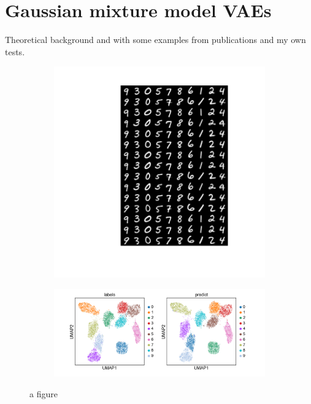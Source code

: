 \documentclass[11pt, a4paper]{report}
\theoremstyle{plain}
\theoremstyle{definition}
\theoremstyle{remark}
\begin{document}
\chapter{Gaussian mixture model VAEs}

Theoretical background and 
with some examples from publications and my own tests.


\begin{figure}
\centering
\begin{subfigure}[b]{0.4\textwidth}
\includegraphics[width=\textwidth]{images/model_mnist_10c_generation.png}
\caption{}
\end{subfigure}
\begin{subfigure}[b]{0.4\textwidth}
\includegraphics[width=\textwidth]{images/model_mnist_10c_umap.png}
\caption{}
\end{subfigure}
\caption{a figure}
\label{fig:myfig}
\end{figure}
\end{document}
